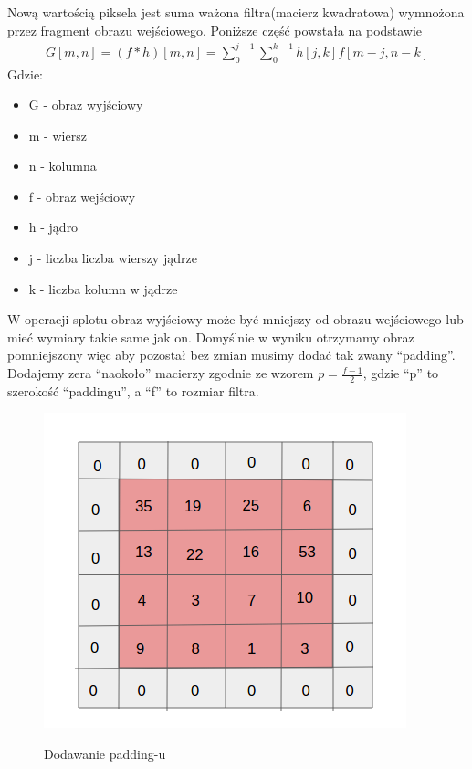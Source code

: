 \documentclass{article}
\begin{document}
Nową wartością piksela jest suma ważona filtra(macierz kwadratowa) wymnożona przez fragment obrazu wejściowego.
Poniższe część powstała na podstawie \cite{convolution-math}
\begin{align*}
    G[m,n] = (f*h)[m,n] = \sum_0^{j-1}\sum_0^{k-1} h[j,k]f[m-j,n-k]
\end{align*}
Gdzie:
\begin{itemize}
    \item G - obraz wyjściowy
    \item m - wiersz
    \item n - kolumna
    \item f - obraz wejściowy
    \item h - jądro
    \item j - liczba liczba wierszy jądrze
    \item k - liczba kolumn w jądrze
\end{itemize}
W operacji splotu obraz wyjściowy może być mniejszy od obrazu wejściowego lub mieć wymiary takie same jak on.
Domyślnie w wyniku otrzymamy obraz pomniejszony więc aby pozostał bez zmian musimy dodać tak zwany ``padding''.
Dodajemy zera ``naokoło'' macierzy zgodnie ze wzorem $p = \frac{f-1}{2}$, gdzie ``p'' to szerokość ``paddingu'', a ``f'' to rozmiar filtra.
\begin{figure}[H]
    \centering
    \includegraphics[width=\linewidth]{images/padding.png}
    \caption{Dodawanie padding-u}
    \cite{padding}
\end{figure}
\end{document}
